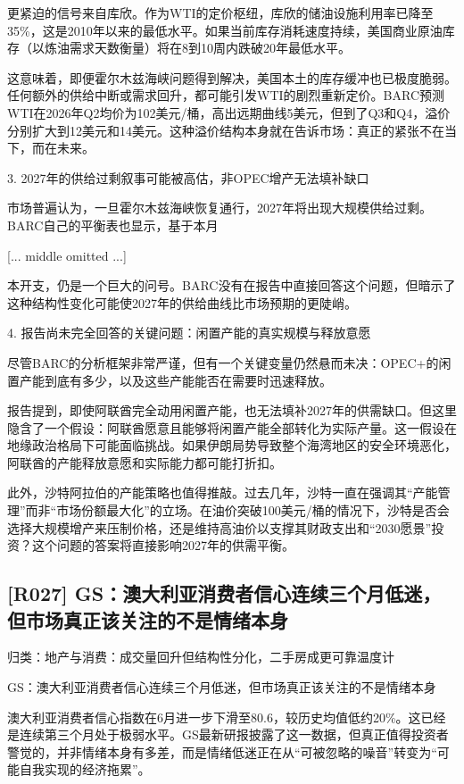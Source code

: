 \documentclass[11pt]{ctexart}
\begin{document}
更紧迫的信号来自库欣。作为WTI的定价枢纽，库欣的储油设施利用率已降至35\%，这是2010年以来的最低水平。如果当前库存消耗速度持续，美国商业原油库存（以炼油需求天数衡量）将在8到10周内跌破20年最低水平。

这意味着，即便霍尔木兹海峡问题得到解决，美国本土的库存缓冲也已极度脆弱。任何额外的供给中断或需求回升，都可能引发WTI的剧烈重新定价。BARC预测WTI在2026年Q2均价为102美元/桶，高出远期曲线5美元，但到了Q3和Q4，溢价分别扩大到12美元和14美元。这种溢价结构本身就在告诉市场：真正的紧张不在当下，而在未来。

3. 2027年的供给过剩叙事可能被高估，非OPEC增产无法填补缺口

市场普遍认为，一旦霍尔木兹海峡恢复通行，2027年将出现大规模供给过剩。BARC自己的平衡表也显示，基于本月

[... middle omitted ...]

本开支，仍是一个巨大的问号。BARC没有在报告中直接回答这个问题，但暗示了这种结构性变化可能使2027年的供给曲线比市场预期的更陡峭。

4. 报告尚未完全回答的关键问题：闲置产能的真实规模与释放意愿

尽管BARC的分析框架非常严谨，但有一个关键变量仍然悬而未决：OPEC+的闲置产能到底有多少，以及这些产能能否在需要时迅速释放。

报告提到，即使阿联酋完全动用闲置产能，也无法填补2027年的供需缺口。但这里隐含了一个假设：阿联酋愿意且能够将闲置产能全部转化为实际产量。这一假设在地缘政治格局下可能面临挑战。如果伊朗局势导致整个海湾地区的安全环境恶化，阿联酋的产能释放意愿和实际能力都可能打折扣。

此外，沙特阿拉伯的产能策略也值得推敲。过去几年，沙特一直在强调其“产能管理”而非“市场份额最大化”的立场。在油价突破100美元/桶的情况下，沙特是否会选择大规模增产来压制价格，还是维持高油价以支撑其财政支出和“2030愿景”投资？这个问题的答案将直接影响2027年的供需平衡。

\subsection{[R027] GS：澳大利亚消费者信心连续三个月低迷，但市场真正该关注的不是情绪本身}
{\small\color{refgray}归类：地产与消费：成交量回升但结构性分化，二手房成更可靠温度计}

GS：澳大利亚消费者信心连续三个月低迷，但市场真正该关注的不是情绪本身

澳大利亚消费者信心指数在6月进一步下滑至80.6，较历史均值低约20\%。这已经是连续第三个月处于极弱水平。GS最新研报披露了这一数据，但真正值得投资者警觉的，并非情绪本身有多差，而是情绪低迷正在从“可被忽略的噪音”转变为“可能自我实现的经济拖累”。
\end{document}
